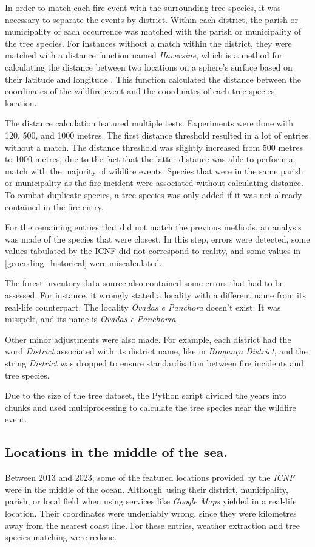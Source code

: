In order to match each fire event with the surrounding tree species, it was necessary to separate the events by district. Within each district, the parish or municipality of each occurrence was matched with the parish or municipality of the tree species. For instances without a match within the district, they were matched with a distance function named \textit{Haversine}, which is a method for calculating the distance between two locations on a sphere's surface based on their latitude and longitude \cite{esri2024}. This function calculated the distance between the coordinates of the wildfire event and the coordinates of each tree species location. 


The distance calculation featured multiple tests. Experiments were done with 120, 500, and 1000 metres. The first distance threshold resulted in a lot of entries without a match. The distance threshold was slightly increased from 500 metres to 1000 metres, due to the fact that the latter distance was able to perform a match with the majority of wildfire events. Species that were in the same parish or municipality as the fire incident were associated without calculating distance. To combat duplicate species, a tree species was only added if it was not already contained in the fire entry.

For the remaining entries that did not match the previous methods, an analysis was made of the species that were closest. In this step, errors were detected, some values tabulated by the ICNF did not correspond to reality, and some values in \ref{geocoding_historical} were miscalculated.


The forest inventory data source also contained some errors that had to be assessed. For instance, it wrongly stated a locality with a different name from its real-life counterpart. The locality \textit{Ovadas e Panchora} doesn't exist. It was misspelt, and its name is \textit{Ovadas e Panchorra}.


Other minor adjustments were also made. For example, each district had the word \textit{District} associated with its district name, like in \textit{Bragança District}, and the string \textit{District} was dropped to ensure standardisation between fire incidents and tree species.

Due to the size of the tree dataset, the Python script divided the years into chunks and used multiprocessing to calculate the tree species near the wildfire event.



\subsection{Locations in the middle of the sea.}
Between 2013 and 2023, some of the featured locations provided by the \textit{ICNF} were in the middle of the ocean. Although using their district, municipality, parish, or local field when using services like \textit{Google Maps} yielded in a real-life location. Their coordinates were undeniably wrong, since they were kilometres away from the nearest coast line. For these entries, weather extraction and tree species matching were redone. 


